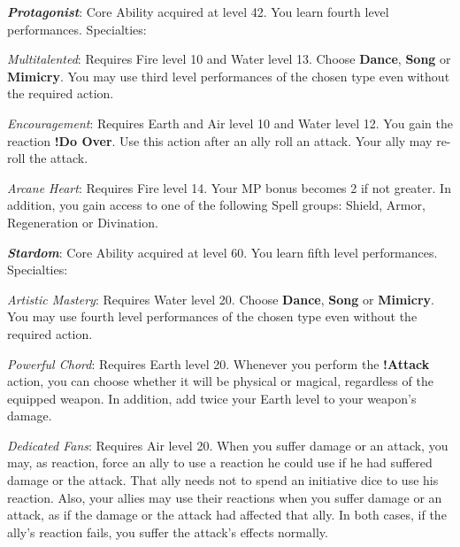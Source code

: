 \textbf{\textit{Protagonist}}: Core Ability acquired at level 42. You learn fourth level performances. Specialties:

\textit{Multitalented}: Requires Fire level 10 and Water level 13. Choose \textbf{Dance}, \textbf{Song} or \textbf{Mimicry}. You may use third level performances of the chosen type even without the required action.

\textit{Encouragement}: Requires Earth and Air level 10 and Water level 12. You gain the reaction \textbf{!Do Over}. Use this action after an ally roll an attack. Your ally may re-roll the attack.

\textit{Arcane Heart}: Requires Fire level 14. Your MP bonus becomes 2 if not greater. In addition, you gain access to one of the following Spell groups: Shield, Armor, Regeneration or Divination.




\textbf{\textit{Stardom}}: Core Ability acquired at level 60. You learn fifth level performances. Specialties:

\textit{Artistic Mastery}: Requires Water level 20. Choose \textbf{Dance}, \textbf{Song} or \textbf{Mimicry}. You may use fourth level performances of the chosen type even without the required action.

\textit{Powerful Chord}: Requires Earth level 20. Whenever you perform the \textbf{!Attack} action, you can choose whether it will be physical or magical, regardless of the equipped weapon. In addition, add twice your Earth level to your weapon's damage.

\textit{Dedicated Fans}: Requires Air level 20. When you suffer damage or an attack, you may, as reaction, force an ally to use a reaction he could use if he had suffered damage or the attack. That ally needs not to spend an initiative dice to use his reaction. Also, your allies may use their reactions when you suffer damage or an attack, as if the damage or the attack had affected that ally. In both cases, if the ally's reaction fails, you suffer the attack's effects normally.





